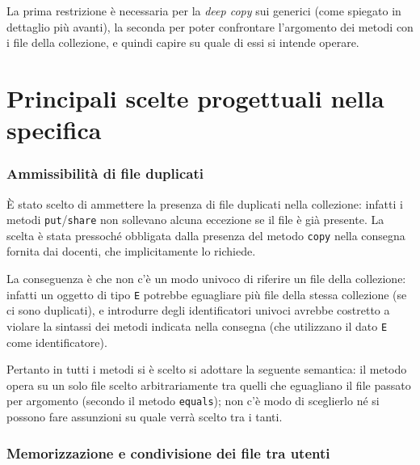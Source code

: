 \documentclass[a4paper,10pt]{article}
\begin{document}
 La prima restrizione è necessaria per la \textit{deep copy} sui generici (come spiegato in dettaglio più avanti), la seconda per poter confrontare l'argomento dei metodi con i file della collezione, e quindi capire su quale di essi si intende operare.
  
 \vspace{-0.3 cm}
 \section{ Principali scelte progettuali nella specifica }
 
 \vspace{-0.1cm}
 \subsubsection*{ Ammissibilità di file duplicati }
 \vspace{-0.1cm}
 \`{E} stato scelto di ammettere la presenza di file duplicati nella collezione: infatti i metodi \texttt{put}/\texttt{share} non sollevano alcuna eccezione se il file è già presente. La scelta è stata pressoché obbligata dalla presenza del metodo \texttt{copy} nella consegna fornita dai docenti, che implicitamente lo richiede.
 
 La conseguenza è che non c'è un modo univoco di riferire un file della collezione: infatti un oggetto di tipo \texttt{E} potrebbe eguagliare più file della stessa collezione (se ci sono duplicati), e introdurre degli identificatori univoci avrebbe costretto a violare la sintassi dei metodi indicata nella consegna (che utilizzano il dato \texttt{E} come identificatore).
 
 Pertanto in tutti i metodi si è scelto si adottare la seguente semantica: il metodo opera su un solo file scelto arbitrariamente tra quelli che eguagliano il file passato per argomento (secondo il metodo \texttt{equals}); non c'è modo di sceglierlo né si possono fare assunzioni su quale verrà scelto tra i tanti.
 
 \vspace{-0.3cm}
 \subsubsection*{ Memorizzazione e condivisione dei file tra utenti }
 \vspace{-0.1cm}
 
\end{document}
